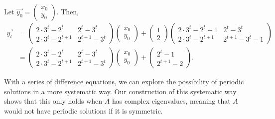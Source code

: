 \documentclass[a4paper, 12pt,oneside,openany]{book}
\begin{document}
{	Let $\vec{y_0} = \begin{pmatrix} x_0 \\ y_0 \end{pmatrix}$.  Then, \begin{align*} \vec{y_t} &= \begin{pmatrix} 2\cdot 3^t -2^t & 2^t-3^t \\ 2\cdot 3^t-2^{t+1} & 2^{t+1}-3^t \end{pmatrix} \begin{pmatrix} x_0 \\ y_0 \end{pmatrix} + \begin{pmatrix} 1 \\ 2 \end{pmatrix} \begin{pmatrix} 2\cdot 3^t -2^t-1 & 2^t-3^t \\ 2\cdot 3^t-2^{t+1} & 2^{t+1}-3^t-1 \end{pmatrix} \\ &= \begin{pmatrix} 2\cdot 3^t -2^t & 2^t-3^t \\ 2\cdot 3^t-2^{t+1} & 2^{t+1}-3^t \end{pmatrix} \begin{pmatrix} x_0\\y_0 \end{pmatrix}+ \begin{pmatrix} 2^t-1 \\ 2^{t+1}-2 \end{pmatrix}. \end{align*} 
}



With a series of difference equations, we can explore the possibility of periodic solutions in a more systematic way. Our construction of this systematic way shows that this only holds when $A$ has complex eigenvalues, meaning that $A$ would not have periodic solutions if it is symmetric.
\end{document}
